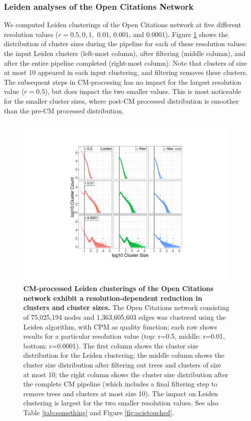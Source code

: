 \documentclass[11pt]{article}   	%
\begin{document}
\subsubsection{Leiden analyses of the Open Citations Network}
We computed Leiden clusterings of the Open Citations network at five different resolution values ($r=0.5, 0,1,$ $0.01$, $0.001$, and $0.0001$). Figure \ref{fig:oc_size_count_plots_leiden} shows the distribution of cluster sizes during the pipeline for each of these resolution values:  the input Leiden clusters (left-most column), after filtering (middle column), and after the entire pipeline completed  (right-most column).
Note that clusters of size at most 10 appeared in each input clustering, and filtering removes these clusters.
The subsequent steps in CM-processing  has no impact for the largest resolution value ($r=0.5$), but does impact the two smaller values. This is most noticeable for the smaller cluster sizes, where post-CM processed distribution is smoother than the pre-CM processed distribution.





\begin{figure}[H]
\centering
\includegraphics[width=\linewidth]{figs/fig1_kn.pdf}
\caption{\textbf{CM-processed Leiden clusterings of the Open Citations network exhibit a resolution-dependent reduction in clusters and cluster sizes.}
The Open Citations network consisting of 75,025,194 nodes and 1,363,605,603 edges was clustered using the Leiden algorithm,
with CPM as quality function; each row shows results for a particular resolution value (top: r=0.5, middle: r=0.01, bottom: r=0.0001).
The first column shows the cluster size distribution for the Leiden clustering; the middle column shows the cluster size distribution after filtering out trees and clusters of size at most 10; the right column shows the cluster size distribution after the complete CM pipeline (which includes a final filtering step to remove trees and clusters at most size 10).
The impact on Leiden clustering is largest for the two smaller resolution values.
See also   Table \ref{tab:something} and Figure \ref{fig:ocistouched}.}
\label{fig:oc_size_count_plots_leiden}
\end{figure}
\end{document}
